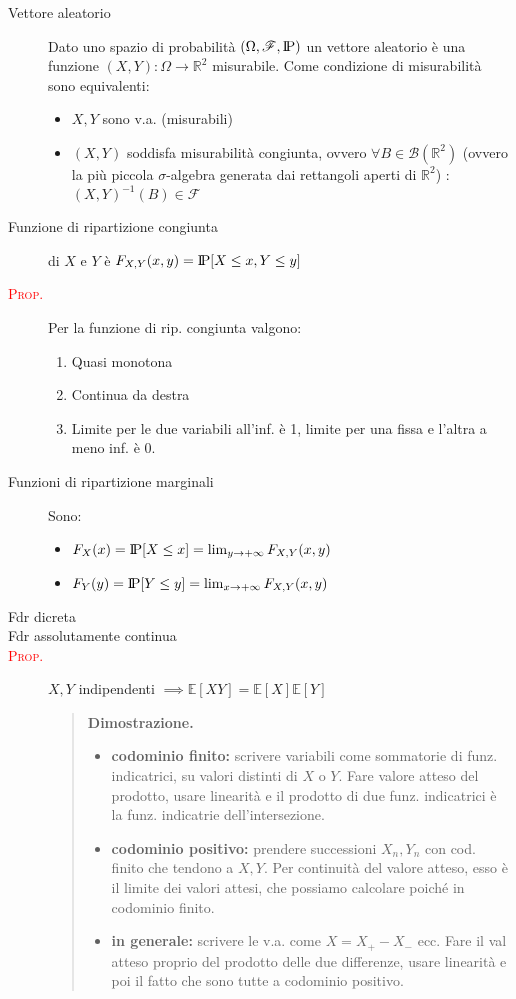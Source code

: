 \documentclass[a4paper,10pt]{article}
\newcommand{\myth}{\normalfont \scshape \textcolor{red}} %
\newcommand{\re}{\mathbb{R}} %
\newcommand{\pr}{\text{I\kern-0.15em P}} %
\newcommand{\ex}{\mathbb{E}} %
\theoremstyle{remark}
\theoremstyle{definition}
\newenvironment{dimo}{\begin{quote}\textbf{Dimostrazione.}}{\end{quote}} %
\begin{document}
\begin{description}
    \item[Vettore aleatorio] Dato uno spazio di probabilità $(\Omega,\mathscr{F},\pr)$ un vettore aleatorio è una funzione $(X,Y): \Omega \to \re^2$ misurabile. Come condizione di misurabilità sono equivalenti:
    \begin{itemize}
        \item $X,Y$ sono v.a. (misurabili)
        \item $(X,Y)$ soddisfa misurabilità congiunta, ovvero $\forall B\in\mathcal{B}(\re^2)$ (ovvero la più piccola $\sigma$-algebra generata dai rettangoli aperti di $\re^2$) : $(X,Y)^{-1}(B)\in \mathscr{F}$
    \end{itemize}
    \item[Funzione di ripartizione congiunta] di $X$ e $Y$ è $F_{X,Y}(x,y)=\pr[X\le x, Y\le y]$
    \item[\myth{Prop.}] Per la funzione di rip. congiunta valgono:
    \begin{enumerate}
        \item Quasi monotona
        \item Continua da destra
        \item Limite per le due variabili all'inf. è 1, limite per una fissa e l'altra a meno inf. è 0.
    \end{enumerate}
    \item[Funzioni di ripartizione marginali] Sono:
    \begin{itemize} 
        \item $F_X(x)=\pr[X\le x]= \lim_{y\to+\infty}F_{X,Y}(x,y)$
        \item $F_Y(y)=\pr[Y\le y]= \lim_{x\to+\infty}F_{X,Y}(x,y)$
    \end{itemize}
    \item[Fdr dicreta]
    \item[Fdr assolutamente continua]
    \item[\myth{Prop.}] $X,Y$ indipendenti $\implies \ex[XY]=\ex[X]\ex[Y]$
    \begin{dimo}
        \begin{itemize}
            \item \textbf{codominio finito:} scrivere variabili come sommatorie di funz. indicatrici, su valori distinti di $X$ o $Y$. Fare valore atteso del prodotto, usare linearità e il prodotto di due funz. indicatrici è la funz. indicatrie dell'intersezione.
            \item \textbf{codominio positivo:} prendere successioni $X_n,Y_n$ con cod. finito che tendono a $X,Y$. Per continuità del valore atteso, esso è il limite dei valori attesi, che possiamo calcolare poiché in codominio finito.
            \item \textbf{in generale:} scrivere le v.a. come $X=X_+-X_-$ ecc. Fare il val atteso proprio del prodotto delle due differenze, usare linearità e poi il fatto che sono tutte a codominio positivo.
        \end{itemize}
    \end{dimo}
\end{description}
\end{document}
